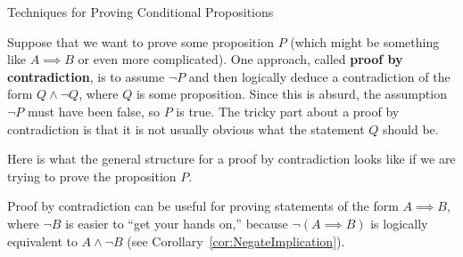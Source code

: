\begin{section}{Techniques for Proving Conditional Propositions}
%
%
%

Suppose that we want to prove some proposition $P$ (which might be something like $A\implies B$ or even more complicated).  One approach, called \textbf{proof by contradiction}, is to assume $\neg P$ and then logically deduce a contradiction of the form $Q\wedge \neg Q$, where $Q$ is some proposition.  Since this is absurd, the assumption $\neg P$ must have been false, so $P$ is true.  The tricky part about a proof by contradiction is that it is not usually obvious what the statement $Q$ should be.

\begin{skeleton}
Here is what the general structure for a proof by contradiction looks like if we are trying to prove the proposition $P$.

\begin{center}
\end{center}
\end{skeleton}

Proof by contradiction can be useful for proving statements of the form $A\implies B$, where $\neg B$ is easier to ``get your hands on,'' because $\neg(A \implies B)$ is logically equivalent to $A \wedge \neg B$ (see Corollary~\ref{cor:NegateImplication}).


\end{section}
